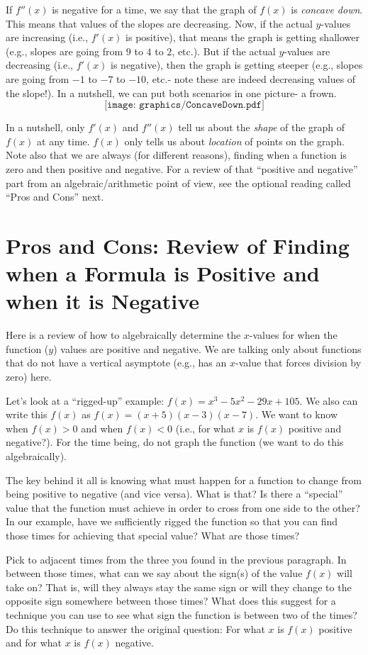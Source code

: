 \documentclass{ximera}
\begin{document}
If $f''(x)$ is negative for a time, we say that the graph of $f(x)$ is {\em concave down}.  This means that values of the slopes are decreasing.  Now, if the actual $y$-values are increasing (i.e., $f'(x)$ is positive), that means the graph is getting shallower (e.g., slopes are going from $9$ to $4$ to $2$, etc.).  But if the actual $y$-values are decreasing (i.e., $f'(x)$ is negative), then the graph is getting steeper (e.g., slopes are going from $-1$ to $-7$ to $-10$, etc.- note these are indeed decreasing values of the slope!).  In a nutshell, we can put both scenarios in one picture- a frown.
\[
\texttt{[image: graphics/ConcaveDown.pdf]}
\]

In a nutshell, only $f'(x)$ and $f''(x)$ tell us about the {\em shape} of the graph of $f(x)$ at any time.  $f(x)$ only tells us about {\em location} of points on the graph.  Note also that we are always (for different reasons), finding when a function is zero and then positive and negative.  For a review of that ``positive and negative'' part from an algebraic/arithmetic point of view, see the optional reading called ``Pros and Cons'' next.

\section*{Pros and Cons: Review of Finding when a Formula is Positive and when it is Negative}

Here is a review of how to algebraically determine the $x$-values for when the function ($y$) values are positive and negative.  We are talking only about functions that do not have a vertical asymptote (e.g., has an $x$-value that forces division by zero) here.

Let's look at a ``rigged-up'' example: $f(x) = x^3-5x^2-29x+105$.  We also can write this $ f(x)$ as $f(x) = (x+5)(x-3)(x-7)$.  We want to know when $f(x) > 0$ and when $f(x) < 0$ (i.e., for what $x$ is $f(x)$ positive and negative?). For the time being, do not graph the function (we want to do this algebraically).

The key behind it all is knowing what must happen for a function to change from being positive to negative (and vice versa).  What is that?  Is there a ``special'' value that the function must achieve in order to cross from one side to the other?  In our example, have we sufficiently rigged the function so that you can find those times for achieving that special value?  What are those times?

Pick to adjacent times from the three you found in the previous paragraph.  In between those times, what can we say about the sign(s) of the value $f(x)$ will take on?  That is, will they always stay the same sign or will they change to the opposite sign somewhere between those times?  What does this suggest for a technique you can use to see what sign the function is between two of the times?  Do this technique to answer the original question: For what $x$ is $f(x)$ positive and for what $x$ is $f(x)$ negative.
\end{document}
